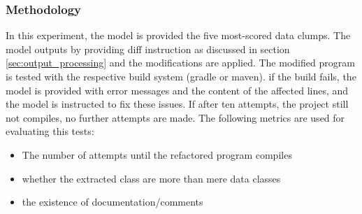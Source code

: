 \subsubsection{Methodology}

In this experiment, the model is provided the five most-scored data clumps. The model outputs by providing diff instruction as discussed in section \ref{sec:output_processing} and the modifications are applied.  The modified program is tested with the respective build system (gradle or maven). if the build fails, the model is provided with error messages and the content of the affected lines, and the model is instructed to fix these issues. If after ten attempts, the project still not compiles, no further attempts are made. 
The following metrics are used for evaluating this tests:

\begin{itemize}
    \item The number of attempts until the refactored program compiles
    \item whether the extracted class are more than mere data classes
    \item the existence of documentation/comments
\end{itemize}


